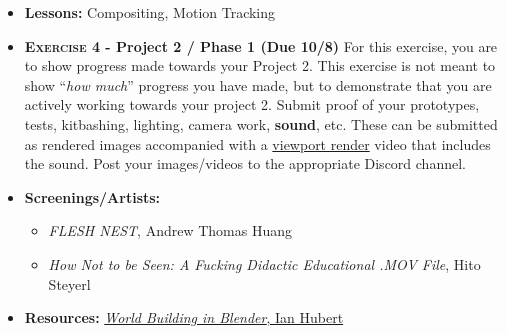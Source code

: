 \def\tues{10/6}%
\def\thur{10/8}%
% 
\begin{itemize}[noitemsep,topsep=0pt,leftmargin=*]
    \item \textbf{Lessons:} Compositing, Motion Tracking
    \item \textbf{\textsc{Exercise 4} - Project 2 / Phase 1 (Due \thur)} For this exercise, you are to show progress made towards your Project 2. This exercise is not meant to show ``\emph{how much}'' progress you have made, but to demonstrate that you are actively working towards your project 2. Submit proof of your prototypes, tests, kitbashing, lighting, camera work, \textbf{sound}, etc. These can be submitted as rendered images accompanied with a \href{https://docs.blender.org/manual/en/latest/editors/3dview/viewport_render.html}{viewport render} video that includes the sound. Post your images/videos to the appropriate Discord channel.
    \item \textbf{Screenings/Artists:}
          \begin{itemize}
              \item \emph{FLESH NEST}, Andrew Thomas Huang
              \item \emph{How Not to be Seen: A Fucking Didactic Educational .MOV File}, Hito Steyerl
          \end{itemize}
    \item \textbf{Resources:} \href{https://www.youtube.com/watch?v=whPWKecazgM}{\emph{World Building in Blender}, Ian Hubert}
\end{itemize}